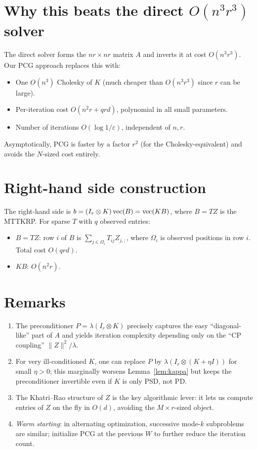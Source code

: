 \section{Why this beats the direct $O(n^3 r^3)$ solver}

The direct solver forms the $nr\times nr$ matrix $A$ and inverts it at cost $O(n^3r^3)$. Our PCG approach replaces this with:
\begin{itemize}
\item One $O(n^3)$ Cholesky of $K$ (much cheaper than $O(n^3r^3)$ since $r$ can be large).
\item Per-iteration cost $O(n^2 r + qrd)$, polynomial in all small parameters.
\item Number of iterations $O(\log 1/\varepsilon)$, independent of $n,r$.
\end{itemize}
Asymptotically, PCG is faster by a factor $r^2$ (for the Cholesky-equivalent) and avoids the $N$-sized cost entirely.

\section{Right-hand side construction}

The right-hand side is $b = (I_r\otimes K)\operatorname{vec}(B) = \operatorname{vec}(KB)$, where $B = TZ$ is the MTTKRP. For sparse $T$ with $q$ observed entries:
\begin{itemize}
\item $B = TZ$: row $i$ of $B$ is $\sum_{j\in\Omega_i} T_{ij} Z_{j,:}$, where $\Omega_i$ is observed positions in row $i$. Total cost $O(qr d)$.
\item $KB$: $O(n^2 r)$.
\end{itemize}

\section{Remarks}

\begin{enumerate}
\item The preconditioner $P=\lambda(I_r\otimes K)$ precisely captures the easy ``diagonal-like'' part of $A$ and yields iteration complexity depending only on the ``CP coupling'' $\|Z\|^2/\lambda$.
\item For very ill-conditioned $K$, one can replace $P$ by $\lambda(I_r\otimes (K+\eta I))$ for small $\eta>0$; this marginally worsens Lemma~\ref{lem:kappa} but keeps the preconditioner invertible even if $K$ is only PSD, not PD.
\item The Khatri--Rao structure of $Z$ is the key algorithmic lever: it lets us compute entries of $Z$ on the fly in $O(d)$, avoiding the $M\times r$-sized object.
\item \emph{Warm starting}: in alternating optimization, successive mode-$k$ subproblems are similar; initialize PCG at the previous $W$ to further reduce the iteration count.
\end{enumerate}

